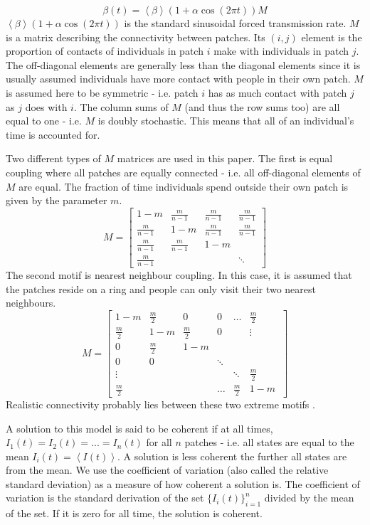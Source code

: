 \documentclass[twocolumn,nofootinbib,showkeys,twoside,floatfix,unsortedaddress,flushbottom,10pt,aps,pra]{report}
\begin{document}
\begin{equation}
  \beta(t) = \left < \beta \right > (1+\alpha \cos(2\pi t))M
\end{equation}
$\left < \beta \right > (1+\alpha \cos(2\pi t))$ is the standard sinusoidal forced transmission rate. $M$ is a matrix describing the connectivity between patches. Its $(i,j)$ element is the proportion of contacts of individuals in patch $i$ make with individuals in patch $j$. The off-diagonal elements are generally less than the diagonal elements since it is usually assumed individuals have more contact with people in their own patch. $M$ is assumed here to be symmetric - i.e. patch $i$ has as much contact with patch $j$ as $j$ does with $i$. The column sums of $M$ (and thus the row sums too) are all equal to one - i.e. $M$ is doubly stochastic. This means that all of an individual's time is accounted for. \par
 \smallskip \qquad
Two different types of $M$ matrices are used in this paper. The first is equal coupling where all patches are equally connected - i.e. all off-diagonal elements of $M$ are equal. The fraction of time individuals spend outside their own patch is given by the parameter $m$.
\[
M =
\begin{bmatrix}
  1-m & \frac{m}{n-1} & \frac{m}{n-1} & \frac{m}{n-1} \\
  \frac{m}{n-1} & 1-m & \frac{m}{n-1} & \frac{m}{n-1}  \\
  \frac{m}{n-1} & \frac{m}{n-1} & 1-m &  \\
  \frac{m}{n-1} &  &  & \ddots 
\end{bmatrix}
\]
The second motif is nearest neighbour coupling. In this case, it is assumed that the patches reside on a ring and people can only visit their two nearest neighbours.
\[
M =
\begin{bmatrix}
  1-m & \frac{m}{2} & 0 & 0 & \dots & \frac{m}{2} \\
  \frac{m}{2} & 1-m & \frac{m}{2} & 0 & & \vdots \\
  0 & \frac{m}{2} & 1-m &  \\
  0 & 0 & & \ddots \\
  \vdots & & & & \ddots & \frac{m}{2} \\
  \frac{m}{2} &  & & \dots & \frac{m}{2} & 1-m \ 
\end{bmatrix}
\]
Realistic connectivity probably lies between these two extreme motifs \cite{Earn2000}.\par
 \smallskip \qquad
A solution to this model is said to be coherent if at all times, $I_1(t)=I_2(t)=...=I_n(t)$ for all $n$ patches \cite{McCluskey2011} - i.e. all states are equal to the mean $I_i(t)=\left < I(t) \right >$. A solution is less coherent the further all states are from the mean. We use the coefficient of variation (also called the relative standard deviation) as a measure of how coherent a solution is. The coefficient of variation is the standard derivation of the set $\{I_i(t)\}_{i=1}^n$ divided by the mean of the set. If it is zero for all time, the solution is coherent.
\end{document}
